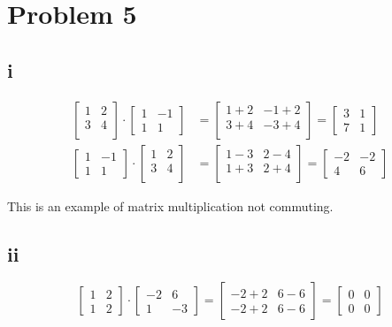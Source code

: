 \documentclass[12pt,letterpaper]{article}
\theoremstyle{definition}
\begin{document}
\section*{Problem 5}

\subsection*{i}

\begin{align*}
  \begin{bmatrix}
    1 & 2 \\
    3 & 4 \\
  \end{bmatrix} \cdot
  \begin{bmatrix}
    1 & -1 \\
    1 & 1
  \end{bmatrix} &=
  \begin{bmatrix}
    1 + 2 & -1 + 2 \\
    3 + 4 & -3 + 4 \\
  \end{bmatrix} = 
  \begin{bmatrix}
    3 & 1 \\
    7 & 1
  \end{bmatrix} \\
  \begin{bmatrix}
    1 & -1 \\
    1 & 1
  \end{bmatrix} \cdot
  \begin{bmatrix}
    1 & 2 \\
    3 & 4 \\
  \end{bmatrix} &=
  \begin{bmatrix}
    1 - 3 & 2 - 4 \\
    1 + 3 & 2 + 4 \\
  \end{bmatrix} = 
  \begin{bmatrix}
    -2 & -2 \\
    4 & 6
  \end{bmatrix}
\end{align*}

This is an example of matrix multiplication not commuting.

\subsection*{ii}

\[
  \begin{bmatrix}
    1 & 2 \\
    1 & 2
  \end{bmatrix} \cdot
  \begin{bmatrix}
    -2 & 6 \\
    1 & -3
  \end{bmatrix} = 
  \begin{bmatrix}
    -2 + 2 & 6 - 6 \\
    -2 + 2 & 6 - 6
  \end{bmatrix} =
  \begin{bmatrix}
    0 & 0 \\
    0 & 0
  \end{bmatrix}
\]
\end{document}
